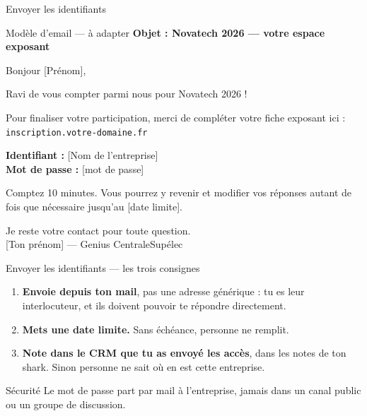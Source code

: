 \documentclass[aspectratio=169,11pt]{beamer}
\newcommand{\domaine}{votre-domaine.fr}
\newcommand{\cle}[1]{\textbf{\textcolor{noirApp}{#1}}}
\newcommand{\lien}[1]{\texttt{\footnotesize #1}}
\begin{document}
\begin{frame}{Envoyer les identifiants}
  \begin{block}{Modèle d'email --- à adapter}
    \footnotesize
    \textbf{Objet : Novatech 2026 --- votre espace exposant}

    \smallskip
    Bonjour [Prénom],

    Ravi de vous compter parmi nous pour Novatech 2026 !

    Pour finaliser votre participation, merci de compléter votre fiche exposant
    ici : \lien{inscription.\domaine}

    \smallskip
    \hspace{1em}\textbf{Identifiant :} [Nom de l'entreprise]\\
    \hspace{1em}\textbf{Mot de passe :} [mot de passe]

    \smallskip
    Comptez 10 minutes. Vous pourrez y revenir et modifier vos réponses autant
    de fois que nécessaire jusqu'au [date limite].

    \smallskip
    Je reste votre contact pour toute question.\\
    {}[Ton prénom] --- Genius CentraleSupélec
  \end{block}
\end{frame}

\begin{frame}{Envoyer les identifiants --- les trois consignes}
  \begin{enumerate}
    \item \cle{Envoie depuis ton mail}, pas une adresse générique : tu es leur
          interlocuteur, et ils doivent pouvoir te répondre directement.
    \item \cle{Mets une date limite.} Sans échéance, personne ne remplit.
    \item \cle{Note dans le CRM que tu as envoyé les accès}, dans les notes de
          ton shark. Sinon personne ne sait où en est cette entreprise.
  \end{enumerate}

  \vfill
  \begin{alertblock}{Sécurité}
    Le mot de passe part par mail à l'entreprise, jamais dans un canal public
    ou un groupe de discussion.
  \end{alertblock}
\end{frame}
\end{document}
